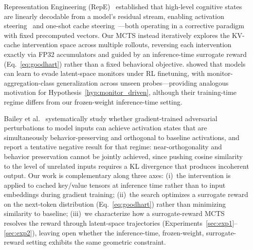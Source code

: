 Representation Engineering (RepE)~\citep{zou2023repe} established that high-level cognitive states are linearly decodable from a model's residual stream, enabling activation steering~\citep{turner2023steering} and one-shot cache steering~\citep{belitsky2025kvcache}---both operating in a corrective paradigm with fixed precomputed vectors. Our MCTS instead iteratively explores the KV-cache intervention space across multiple rollouts, reversing each intervention exactly via FP32 accumulators and guided by an inference-time surrogate reward (Eq.~\ref{eq:goodhart}) rather than a fixed behavioral objective. \citet{gupta2025rlobfuscation} showed that models can learn to evade latent-space monitors under RL finetuning, with monitor-aggregation-class generalization across unseen probes---providing analogous motivation for Hypothesis~\ref{hyp:monitor_driven}, although their training-time regime differs from our frozen-weight inference-time setting.

Bailey et al.~\citep{bailey2024obfuscated} systematically study whether gradient-trained adversarial perturbations to model inputs can achieve activation states that are simultaneously behavior-preserving and orthogonal to baseline activations, and report a tentative negative result for that regime: near-orthogonality and behavior preservation cannot be jointly achieved, since pushing cosine similarity to the level of unrelated inputs requires a KL divergence that produces incoherent output. Our work is complementary along three axes: (i)~the intervention is applied to cached key/value tensors at inference time rather than to input embeddings during gradient training; (ii)~the search optimizes a surrogate reward on the next-token distribution (Eq.~\ref{eq:goodhart}) rather than minimizing similarity to baseline; (iii)~we characterize how a surrogate-reward MCTS resolves the reward through latent-space trajectories (Experiments~\ref{sec:exp1}--\ref{sec:exp2}), leaving open whether the inference-time, frozen-weight, surrogate-reward setting exhibits the same geometric constraint.
